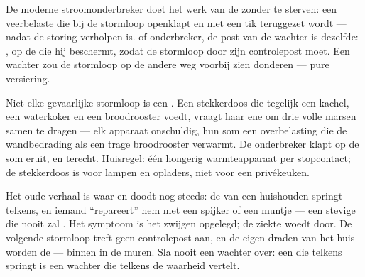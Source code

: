 \begin{example}\label{ex:g7:short-circuits-safety:breaker}
De moderne stroomonderbreker doet het werk van de  zonder te
sterven: een veerbelaste  die bij de stormloop openklapt en
met een tik teruggezet wordt --- nadat de storing verholpen is.
 of onderbreker, de post van de wachter is dezelfde:
\emph{}, op de  die hij beschermt, zodat de
stormloop door zijn controlepost moet. Een wachter  zou de
stormloop op de andere weg voorbij zien donderen --- pure versiering.
\end{example}

\begin{example}\label{ex:g7:short-circuits-safety:overload}
Niet elke gevaarlijke stormloop is een . Een
stekkerdoos die tegelijk een kachel, een waterkoker en een
broodrooster voedt, vraagt haar ene  om drie volle marsen samen
te dragen --- elk apparaat onschuldig, hun som een overbelasting die
de wandbedrading als een trage broodrooster verwarmt. De onderbreker
klapt op de som eruit, en terecht. Huisregel: één hongerig
warmteapparaat per stopcontact; de stekkerdoos is voor lampen en
opladers, niet voor een privékeuken.
\end{example}

\begin{remark}\label{rem:g7:short-circuits-safety:nail}
Het oude verhaal is waar en doodt nog steeds: de  van een
huishouden springt telkens, en iemand ``repareert'' hem met een
spijker of een muntje --- een stevige  die nooit zal
. Het symptoom is het zwijgen opgelegd; de ziekte woedt door.
De volgende stormloop treft geen controlepost aan, en de eigen draden
van het huis worden de  --- binnen in de muren. Sla nooit een
wachter over: een  die telkens springt is een wachter die
telkens de waarheid vertelt.
\end{remark}

